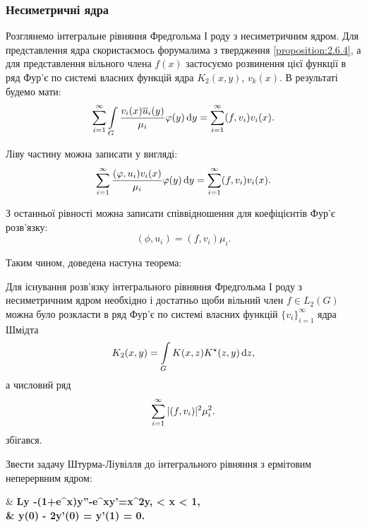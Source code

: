 \subsubsection{Несиметричні ядра}

Розглянемо інтегральне рівняння Фредгольма І роду з несиметричним ядром. Для представлення ядра скористаємось форумалима з твердження \ref{proposition:2.6.4}, а для представлення вільного члена $f(x)$ застосуємо розвинення цієї функції в ряд Фур'є по системі власних функцій ядра $K_2(x,y)$, $v_k(x)$. В результаті будемо мати:
\begin{equation}
	\displaystyle\sum\limits_{i=1}^\infty \displaystyle\int\limits_G \dfrac{v_i(x)\overline u_i(y)}{\mu_i} \varphi(y) \mathop{}\!\mathrm{d} y = \displaystyle\sum\limits_{i=1}^\infty (f,v_i)v_i(x).
\end{equation}

Ліву частину можна записати у вигляді:
\begin{equation}
	\displaystyle\sum\limits_{i=1}^\infty \dfrac{(\varphi,u_i)v_i(x)}{\mu_i} \varphi(y) \mathop{}\!\mathrm{d} y = \displaystyle\sum\limits_{i=1}^\infty (f,v_i)v_i(x).
\end{equation}

З останньої рівності можна записати співвідношення для коефіцієнтів Фур'є розв'язку: 
\begin{equation}
	(\phi,u_i)=(f,v_i)\mu_i.
\end{equation}

Таким чином, доведена настуна теорема:
\begin{theorem}
	Для існування розв'язку інтегрального рівняння Фредгольма І роду з несиметричним ядром необхідно і достатньо щоби вільний член $f\in L_2(G)$ можна було розкласти в ряд Фур'є по системі власних функцій $\{v_i\}_{i=1}^\infty$ ядра Шмідта
	\begin{equation}
		K_2(x,y)=\displaystyle\int\limits_G K(x,z)K^\star (z,y)\mathop{}\!\mathrm{d} z,
	\end{equation}
	а числовий ряд
	\begin{equation}
		\displaystyle\sum\limits_{i=1}^\infty |(f,v_i)|^2 \mu_i^2.
	\end{equation}
	збігався.
\end{theorem}

\newpage

\begin{example}
	Звести задачу Штурма-Ліувілля до інтегрального рівняння з ермітовим неперервним ядром:
	\begin{system*}
		& \bf{L}y \equiv -(1+e^x)y''-e^xy'=\lambda x^2y,  < x < 1, \\
		& y(0) - 2y'(0) = y'(1) = 0.
	\end{system*}
\end{example}

